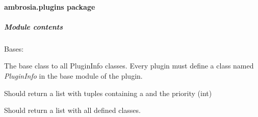 \documentclass[letterpaper,10pt,english]{sphinxmanual}
\begin{document}
\paragraph{ambrosia.plugins package}
\label{ambrosia.plugins:ambrosia-plugins-package}\label{ambrosia.plugins::doc}

\subparagraph{Module contents}
\label{ambrosia.plugins:module-contents}\label{ambrosia.plugins:module-ambrosia.plugins}

\begin{fulllineitems}
\label{ambrosia.plugins:ambrosia.plugins.PluginInfoTop}
Bases: 

The base class to all PluginInfo classes. Every plugin must define a class named \emph{PluginInfo} in the base module
of the plugin.

\begin{fulllineitems}
\label{ambrosia.plugins:ambrosia.plugins.PluginInfoTop.correlators}
Should return a list with tuples containing a  and the priority (int)

\end{fulllineitems}


\begin{fulllineitems}
\label{ambrosia.plugins:ambrosia.plugins.PluginInfoTop.parsers}
Should return a list with all defined  classes.

\end{fulllineitems}


\end{fulllineitems}

\end{document}
